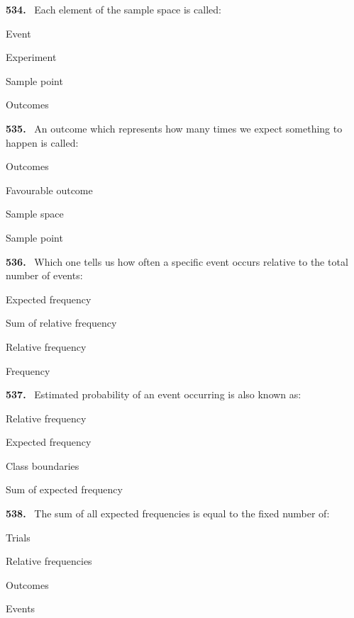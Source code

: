 \documentclass[11pt]{article}
\newenvironment{qenv}[1]{%
  \par\medskip\noindent\textbf{#1.}\ \ignorespaces
}{\par}
\begin{document}
\begin{qenv}{534} Each element of the sample space is called:
\begin{options} \item Event \item Experiment \item Sample point \item Outcomes \end{options} \end{qenv}

\begin{qenv}{535} An outcome which represents how many times we expect something to happen is called:
\begin{options} \item Outcomes \item Favourable outcome \item Sample space \item Sample point \end{options} \end{qenv}

\begin{qenv}{536} Which one tells us how often a specific event occurs relative to the total number of events:
\begin{options} \item Expected frequency \item Sum of relative frequency \item Relative frequency \item Frequency \end{options} \end{qenv}

\begin{qenv}{537} Estimated probability of an event occurring is also known as:
\begin{options} \item Relative frequency \item Expected frequency \item Class boundaries \item Sum of expected frequency \end{options} \end{qenv}

\begin{qenv}{538} The sum of all expected frequencies is equal to the fixed number of:
\begin{options} \item Trials \item Relative frequencies \item Outcomes \item Events \end{options} \end{qenv}
\end{document}
